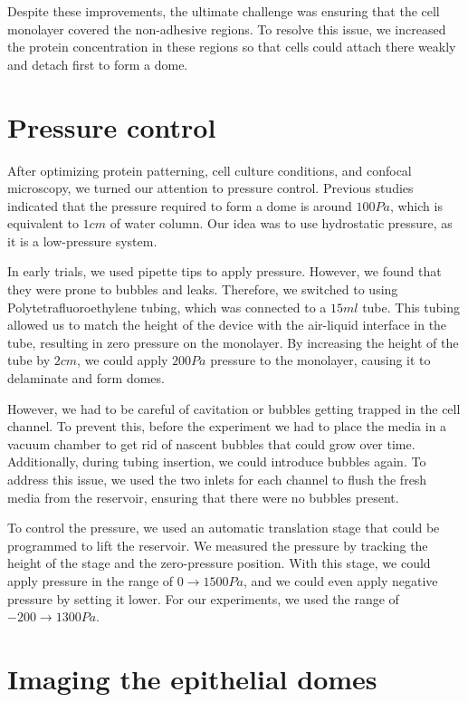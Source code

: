 Despite these improvements, the ultimate challenge was ensuring that the
cell monolayer covered the non-adhesive regions. To resolve this issue,
we increased the protein concentration in these regions so that cells
could attach there weakly and detach first to form a dome.

\hypertarget{pressure-control}{%
\section{Pressure control}\label{pressure-control}}

After optimizing protein patterning, cell culture conditions, and
confocal microscopy, we turned our attention to pressure control.
Previous studies indicated that the pressure required to form a dome is
around \(100Pa\), which is equivalent to \(1cm\) of water column. Our
idea was to use hydrostatic pressure, as it is a low-pressure system.

In early trials, we used pipette tips to apply pressure. However, we
found that they were prone to bubbles and leaks. Therefore, we switched
to using Polytetrafluoroethylene tubing, which was connected to a
\(15ml\) tube. This tubing allowed us to match the height of the device
with the air-liquid interface in the tube, resulting in zero pressure on
the monolayer. By increasing the height of the tube by \(2cm\), we could
apply \(200Pa\) pressure to the monolayer, causing it to delaminate and
form domes.

However, we had to be careful of cavitation or bubbles getting trapped
in the cell channel. To prevent this, before the experiment we had to
place the media in a vacuum chamber to get rid of nascent bubbles that
could grow over time. Additionally, during tubing insertion, we could
introduce bubbles again. To address this issue, we used the two inlets
for each channel to flush the fresh media from the reservoir, ensuring
that there were no bubbles present.

To control the pressure, we used an automatic translation stage that
could be programmed to lift the reservoir. We measured the pressure by
tracking the height of the stage and the zero-pressure position. With
this stage, we could apply pressure in the range of
\(0\rightarrow 1500Pa\), and we could even apply negative pressure by
setting it lower. For our experiments, we used the range of
\(-200\rightarrow 1300Pa\).


\hypertarget{imaging-the-epithelial-domes}{%
\section{Imaging the epithelial
domes}\label{imaging-the-epithelial-domes}}

